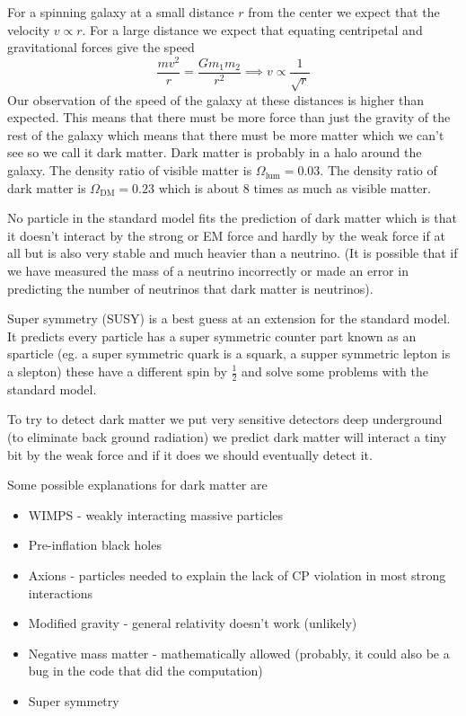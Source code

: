 For a spinning galaxy at a small distance \(r\) from the center we expect that the velocity \(v\propto r\). For a large distance we expect that equating centripetal and gravitational forces give the speed
\[\frac{mv^2}{r}=\frac{Gm_1m_2}{r^2}\implies v\propto\frac{1}{\sqrt{r}}\]
Our observation of the speed of the galaxy at these distances is higher than expected. This means that there must be more force than just the gravity of the rest of the galaxy which means that there must be more matter which we can't see so we call it dark matter. Dark matter is probably in a halo around the galaxy. The density ratio of visible matter is \(\Omega_\mathrm{lum}=0.03\). The density ratio of dark matter is \(\Omega_\mathrm{DM}=0.23\) which is about 8 times as much as visible matter.

No particle in the standard model fits the prediction of dark matter which is that it doesn't interact by the strong or EM force and hardly by the weak force if at all but is also very stable and much heavier than a neutrino. (It is possible that if we have measured the mass of a neutrino incorrectly or made an error in predicting the number of neutrinos that dark matter is neutrinos).

Super symmetry (SUSY) is a best guess at an extension for the standard model. It predicts every particle has a super symmetric counter part known as an sparticle (eg. a super symmetric quark is a squark, a supper symmetric lepton is a slepton) these have a different spin by \(\frac 12\) and solve some problems with the standard model.

To try to detect dark matter we put very sensitive detectors deep underground (to eliminate back ground radiation) we predict dark matter will interact a tiny bit by the weak force and if it does we should eventually detect it.

Some possible explanations for dark matter are
\begin{itemize}
\item WIMPS - weakly interacting massive particles
\item Pre-inflation black holes
\item Axions - particles needed to explain the lack of CP violation in most strong interactions
\item Modified gravity - general relativity doesn't work (unlikely)
\item Negative mass matter - mathematically allowed (probably, it could also be a bug in the code that did the computation)
\item Super symmetry
\end{itemize}

